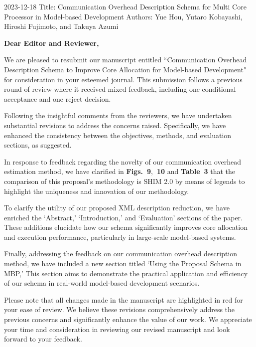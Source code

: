\documentclass{article}
\begin{document}
\begin{flushleft}
  2023-12-18\newline
  Title: Communication Overhead Description Schema for Multi Core Processor in Model-based Development\newline
  Authors: Yue Hou, Yutaro Kobayashi, Hiroshi Fujimoto, and Takuya Azumi \newline
\end{flushleft}
\textbf{Dear Editor and Reviewer,}\newline

We are pleased to resubmit our manuscript entitled ``Communication Overhead Description Schema to Improve Core Allocation for Model-based Development" for consideration in your esteemed journal. This submission follows a previous round of review where it received mixed feedback, including one conditional acceptance and one reject decision.

Following the insightful comments from the reviewers, we have undertaken substantial revisions to address the concerns raised. Specifically, we have enhanced the consistency between the objectives, methods, and evaluation sections, as suggested.

In response to feedback regarding the novelty of our communication overhead estimation method, we have clarified in \textbf{Figs.~9},\textbf{~10} and \textbf{Table~3} that the comparison of this proposal's methodology is SHIM 2.0 by means of legends to highlight the uniqueness and innovation of our methodology.

To clarify the utility of our proposed XML description reduction, we have enriched the `Abstract,' `Introduction,' and `Evaluation' sections of the paper. These additions elucidate how our schema significantly improves core allocation and execution performance, particularly in large-scale model-based systems.

Finally, addressing the feedback on our communication overhead description method, we have included a new section titled `Using the Proposal Schema in MBP,' This section aims to demonstrate the practical application and efficiency of our schema in real-world model-based development scenarios.

Please note that all changes made in the manuscript are highlighted in red for your ease of review. We believe these revisions comprehensively address the previous concerns and significantly enhance the value of our work.
We appreciate your time and consideration in reviewing our revised manuscript and look forward to your feedback.\newline\newline
\end{document}
